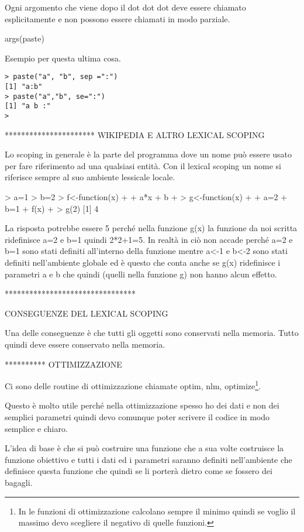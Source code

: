 Ogni argomento che viene dopo il dot dot dot deve essere chiamato esplicitamente
e non possono essere chiamati in modo parziale.

args(paste)

Esempio per questa ultima cosa.
\begin{lstlisting}
> paste("a", "b", sep =":")
[1] "a:b"
> paste("a","b", se=":")
[1] "a b :"
> 
\end{lstlisting}



********************** WIKIPEDIA E ALTRO LEXICAL SCOPING

Lo scoping in generale è la parte del programma dove un nome può essere usato per
fare riferimento ad una qualsiasi entità.
Con il lexical scoping un nome si riferisce sempre al suo ambiente lessicale locale.

> a=1
> b=2
> f<-function(x)
+ {
+   a*x + b
+ }
> g<-function(x)
+ {
+   a=2
+   b=1
+   f(x)
+ }
> g(2)
[1] 4

La risposta potrebbe essere 5 perché nella funzione g(x) la funzione da noi scritta
ridefinisce a=2 e b=1 quindi 2*2+1=5.
In realtà in \erre ciò non accade perché a=2 e b=1 sono stati definiti all'interno
della funzione mentre a<-1 e b<-2 sono stati definiti nell'ambiente globale ed è
questo che conta anche se g(x) ridefinisce i parametri a e b che quindi (quelli
nella funzione g) non hanno alcun effetto.

********************************


CONSEGUENZE DEL LEXICAL SCOPING

Una delle conseguenze è che tutti gli oggetti sono conservati nella memoria.
Tutto quindi deve essere conservato nella memoria.


********** OTTIMIZZAZIONE

Ci sono delle routine di ottimizzazione chiamate optim, nlm, optimize\footnote{In \erre le funzioni di ottimizzazione calcolano sempre il minimo quindi se voglio il massimo devo scegliere il negativo di quelle funzioni.}.

Questo è molto utile perché nella ottimizzazione spesso ho dei dati e non dei semplici parametri quindi devo comunque poter scrivere il codice in modo semplice e chiaro.

L'idea di base è che si può costruire una funzione che a sua volte costruisce la funzione obiettivo e tutti i dati ed i parametri saranno definiti nell'ambiente che definisce questa funzione che quindi se li porterà dietro come se fossero dei bagagli.

